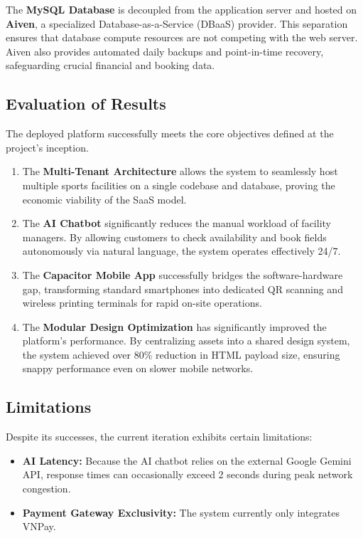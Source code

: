 The \textbf{MySQL Database} is decoupled from the application server and hosted on \textbf{Aiven}, a specialized Database-as-a-Service (DBaaS) provider. This separation ensures that database compute resources are not competing with the web server. Aiven also provides automated daily backups and point-in-time recovery, safeguarding crucial financial and booking data.

\subsection{Evaluation of Results}
The deployed platform successfully meets the core objectives defined at the project's inception. 
\begin{enumerate}
    \item The \textbf{Multi-Tenant Architecture} allows the system to seamlessly host multiple sports facilities on a single codebase and database, proving the economic viability of the SaaS model.
    \item The \textbf{AI Chatbot} significantly reduces the manual workload of facility managers. By allowing customers to check availability and book fields autonomously via natural language, the system operates effectively 24/7.
    \item The \textbf{Capacitor Mobile App} successfully bridges the software-hardware gap, transforming standard smartphones into dedicated QR scanning and wireless printing terminals for rapid on-site operations.
    \item The \textbf{Modular Design Optimization} has significantly improved the platform's performance. By centralizing assets into a shared design system, the system achieved over 80\% reduction in HTML payload size, ensuring snappy performance even on slower mobile networks.
\end{enumerate}

\subsection{Limitations}
Despite its successes, the current iteration exhibits certain limitations:
\begin{itemize}
    \item \textbf{AI Latency:} Because the AI chatbot relies on the external Google Gemini API, response times can occasionally exceed 2 seconds during peak network congestion.
    \item \textbf{Payment Gateway Exclusivity:} The system currently only integrates VNPay.
\end{itemize}

